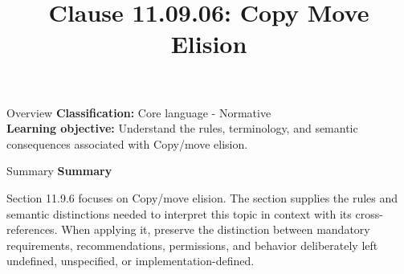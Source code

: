 \documentclass[10pt,letterpaper]{article}
\title{Clause 11.09.06: Copy Move Elision}
\author{}
\date{}
\begin{document}
\maketitle
\begin{CornellOverviewBox}{Overview}
\textbf{Classification:} Core language - Normative\\[2pt]
\textbf{Learning objective:} Understand the rules, terminology, and semantic consequences associated with Copy/move elision.
\end{CornellOverviewBox}\begin{CornellSummaryBox}{Summary}
{\sffamily\bfseries\color{Accent} Summary}\par\vspace{3pt}Section 11.9.6 focuses on Copy/move elision. The section supplies the rules and semantic distinctions needed to interpret this topic in context with its cross-references. When applying it, preserve the distinction between mandatory requirements, recommendations, permissions, and behavior deliberately left undefined, unspecified, or implementation-defined.
\end{CornellSummaryBox}
\end{document}
